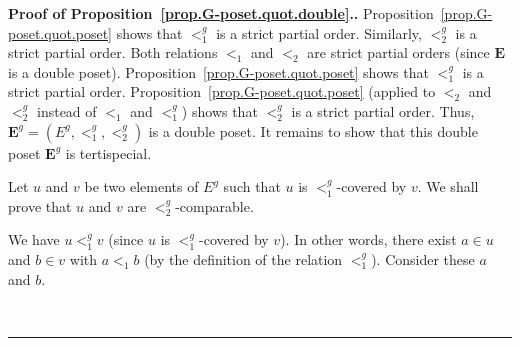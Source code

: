 \documentclass[numbers=enddot,12pt,final,onecolumn,notitlepage,abstracton]{scrartcl}
\theoremstyle{definition}
\newenvironment{proof}[1][Proof]{\noindent\textbf{#1.} }{\ \rule{0.5em}{0.5em}}
\newenvironment{verlong}{}{}
\newenvironment{vershort}{}{}
\newcommand{\EE}{{\mathbf{E}}}
\begin{document}
\begin{proof}[Proof of Proposition~\ref{prop.G-poset.quot.double}.]
\begin{vershort}
Proposition~\ref{prop.G-poset.quot.poset} shows that $<_{1}^{g}$ is a
strict partial order. Similarly, $<_{2}^{g}$ is a
strict partial order.
\end{vershort}
\begin{verlong}
Both relations $<_1$ and $<_2$ are strict partial orders
(since $\EE$ is a double poset).
Proposition~\ref{prop.G-poset.quot.poset} shows that $<_{1}^{g}$ is a
strict partial order.
Proposition~\ref{prop.G-poset.quot.poset} (applied to $<_2$ and
$<_2^g$ instead of $<_1$ and $<_1^g$) shows that $<_{2}^{g}$ is a
strict partial order.
\end{verlong}
Thus, $\EE^g
= \left(E^g, <_1^g, <_2^g\right)$ is a double poset. It remains
to show that this double poset $\EE^g$ is tertispecial.

Let $u$ and $v$ be two elements of
$E^{g}$ such that $u$ is $<_{1}^{g}$-covered by $v$. We shall prove that $u$
and $v$ are $<_{2}^{g}$-comparable.

We have $u<_{1}^{g}v$ (since $u$ is $<_{1}^{g}$-covered by $v$). In other
words, there exist $a\in u$ and $b\in v$ with $a<_{1}b$ (by the
definition of the relation $<_{1}^{g}$). Consider these $a$ and $b$.


\end{proof}
\end{document}
